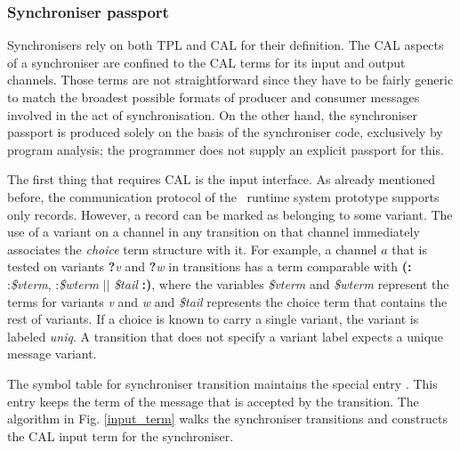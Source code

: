   \subsubsection{Synchroniser passport}
Synchronisers rely on both TPL and CAL for their definition. The CAL aspects of a synchroniser are confined to the CAL terms for its input and output channels. Those terms are not straightforward since they have to be fairly generic to match the broadest possible formats of producer and consumer messages involved in the act of synchronisation. On the other hand, the synchroniser passport is produced solely on the basis of the synchroniser code, exclusively by program analysis; the programmer does not supply an explicit passport for this.

The first thing that requires CAL is the input interface. As already mentioned before, the communication protocol of the \ak\ runtime system prototype supports only records. However, a record can be marked as belonging to some variant. The use of a variant on a channel in any transition on that channel immediately associates the \emph{choice} term structure with it. For example, a channel $a$ that is tested on variants \textbf{?}\emph{v} and \textbf{?}\emph{w} in transitions has a term comparable with \textbf{(:} :\emph{\$vterm}, :\emph{\$wterm} $||$ \emph{\$tail} \textbf{:)}, where the variables \emph{\$vterm} and \emph{\$wterm} represent the terms for variants \emph{v} and \emph{w} and \emph{\$tail} represents the choice term that contains the rest of variants. If a choice is known to carry a single variant, the variant is labeled \emph{uniq}. A transition that does not specify a variant label expects a unique message variant.

The symbol table for synchroniser transition maintains the special entry . This entry keeps the term of the message that is accepted by the transition. The algorithm in Fig. \ref{input_term} walks the synchroniser transitions and constructs the CAL input term for the synchroniser.

